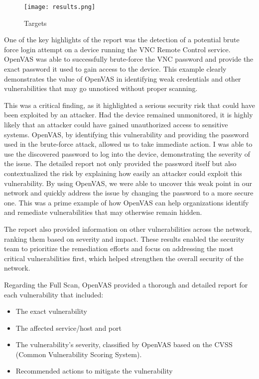 \documentclass[twocolumn]{article}
\begin{document}
\begin{figure}[h!]
    \centering
    \texttt{[image: results.png]}
    \caption{Targets}
\end{figure}


One of the key highlights of the report was the detection of a potential brute force login attempt on a device running the VNC Remote Control service. OpenVAS was able to successfully brute-force the VNC password and provide the exact password it used to gain access to the device. This example clearly demonstrates the value of OpenVAS in identifying weak credentials and other vulnerabilities that may go unnoticed without proper scanning.

This was a critical finding, as it highlighted a serious security risk that could have been exploited by an attacker. Had the device remained unmonitored, it is highly likely that an attacker could have gained unauthorized access to sensitive systems. OpenVAS, by identifying this vulnerability and providing the password used in the brute-force attack, allowed us to take immediate action. I was able to use the discovered password to log into the device, demonstrating the severity of the issue. The detailed report not only provided the password itself but also contextualized the risk by explaining how easily an attacker could exploit this vulnerability. By using OpenVAS, we were able to uncover this weak point in our network and quickly address the issue by changing the password to a more secure one. This was a prime example of how OpenVAS can help organizations identify and remediate vulnerabilities that may otherwise remain hidden.

The report also provided information on other vulnerabilities across the network, ranking them based on severity and impact. These results enabled the security team to prioritize the remediation efforts and focus on addressing the most critical vulnerabilities first, which helped strengthen the overall security of the network.

Regarding the Full Scan, OpenVAS provided a thorough and detailed report for each vulnerability that included:

\begin{itemize}
    \item The exact vulnerability
    \item The affected service/host and port
    \item The vulnerability's severity, classified by OpenVAS based on the CVSS (Common Vulnerability Scoring System).
    \item Recommended actions to mitigate the vulnerability
\end{itemize}
\end{document}
